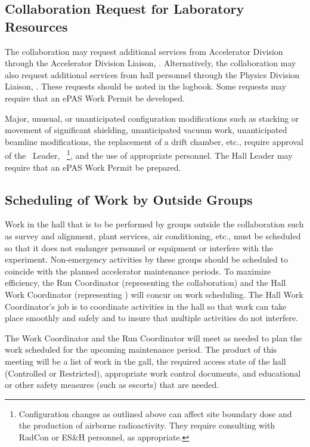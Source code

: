 \documentclass[11pt]{article}
\begin{document}
\subsection{Collaboration Request for Laboratory Resources}
\indent

The collaboration may request additional services from Accelerator
Division through the Accelerator Division Liaison, \ACCDIVLIAISON.  Alternatively,
the collaboration may also request additional services from hall personnel 
through the Physics Division Liaison, \PHYSDIVLIAISON. These requests 
should be noted in the logbook. Some requests may require that an
ePAS Work Permit be developed.

Major, unusual, or unanticipated configuration modifications such as stacking 
or movement of significant shielding, unanticipated vacuum work, unanticipated
beamline modifications, the replacement of a drift chamber, etc., require 
approval of the \HALL\ Leader, \HALLLEADER\ 
\footnote{\label{fn1}Configuration changes as outlined above can affect site
boundary dose and the production of airborne radioactivity. They require
consulting with RadCon or ES\&H personnel, as appropriate.}, and the use of 
appropriate personnel. The Hall Leader may require that an ePAS Work Permit
be prepared.

\subsection{Scheduling of Work by Outside Groups }
\indent

Work in the hall that is to be performed by groups outside the collaboration 
such as survey and alignment, plant services, air conditioning, etc., 
must be scheduled so that it does not 
endanger personnel or equipment or interfere with the experiment.
Non-emergency activities by these groups should be
scheduled to coincide with the planned accelerator maintenance periods. 
To maximize efficiency, the Run Coordinator (representing the collaboration)
and the Hall Work Coordinator (representing \HALL) will concur
on work scheduling.
The Hall Work Coordinator's job is to 
coordinate activities in the hall so that work can take place smoothly 
and safely and to insure that multiple activities do not interfere. 

The Work Coordinator and the Run
Coordinator will meet as needed to plan the work
scheduled for the upcoming maintenance period.
The product of this meeting will be
a list of work in the gall, the required access state of the
hall (Controlled or Restricted), appropriate work 
control documents, and educational or other
safety measures (such as escorts) that are needed.
\end{document}
